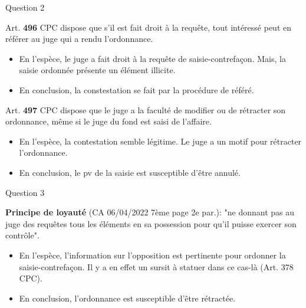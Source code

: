 \begin{frame}{Question 2}
    
\begin{block}{}
Art. \textbf{496} CPC dispose que s'il est fait droit à la requête, tout intéressé peut en référer au juge qui a rendu l'ordonnance.
\end{block}
\begin{itemize}
    \item En l'espèce, le juge a fait droit à la requête de saisie-contrefaçon.
     Mais, la saisie ordonnée présente un élément illicite.
    \item En conclusion, la constestation se fait par la procédure de référé.
\end{itemize}
\begin{block}{}
Art. \textbf{497} CPC dispose que le juge a la faculté de modifier ou de rétracter son ordonnance, même si le juge du fond est saisi de l'affaire.
\end{block}
\begin{itemize}
    \item En l'espèce, la contestation semble légitime.
    Le juge a un motif pour rétracter l'ordonnance.
    \item En conclusion, le pv de la saisie est susceptible d'être annulé. 
\end{itemize}
    
\end{frame}

\begin{frame}{Question 3}
    
\begin{block}{}
\textbf{Principe de loyauté} (CA 06/04/2022 7ème page 2e par.): "ne donnant pas au juge des requêtes
tous les éléments en sa possession pour qu'il puisse exercer son contrôle".
\end{block}

\begin{itemize}
    \item En l'espèce, l'information sur l'opposition est pertinente pour ordonner la saisie-contrefaçon.
    Il y a en effet un sursit à statuer dans ce cas-là (Art. 378 CPC).
    \item En conclusion, l'ordonnance est susceptible d'être rétractée.
\end{itemize}

\end{frame}

